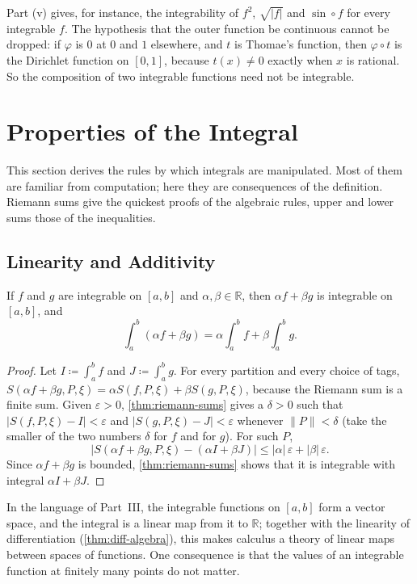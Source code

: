 Part (v) gives, for instance, the integrability of $f^2$, $\sqrt{|f|}$ and $\sin\circ f$ for every integrable $f$. The hypothesis that the outer function be continuous cannot be dropped: if $\varphi$ is $0$ at $0$ and $1$ elsewhere, and $t$ is Thomae's function, then $\varphi\circ t$ is the Dirichlet function on $[0,1]$, because $t(x)\ne0$ exactly when $x$ is rational. So the composition of two integrable functions need not be integrable.

\section{Properties of the Integral}
\label{sec:integral-properties}

This section derives the rules by which integrals are manipulated. Most of them are familiar from computation; here they are consequences of the definition. Riemann sums give the quickest proofs of the algebraic rules, upper and lower sums those of the inequalities.

\subsection{Linearity and Additivity}

\begin{theorem}[Linearity]
\label{thm:integral-linear}
If $f$ and $g$ are integrable on $[a,b]$ and $\alpha,\beta\in\mathbb R$, then $\alpha f+\beta g$ is integrable on $[a,b]$, and
\[
\int_a^b(\alpha f+\beta g)=\alpha\int_a^bf+\beta\int_a^bg .
\]
\end{theorem}

\begin{proof}
Let $I\coloneqq\int_a^bf$ and $J\coloneqq\int_a^bg$. For every partition and every choice of tags, $S(\alpha f+\beta g,P,\xi)=\alpha S(f,P,\xi)+\beta S(g,P,\xi)$, because the Riemann sum is a finite sum. Given $\varepsilon>0$, \cref{thm:riemann-sums} gives a $\delta>0$ such that $|S(f,P,\xi)-I|<\varepsilon$ and $|S(g,P,\xi)-J|<\varepsilon$ whenever $\|P\|<\delta$ (take the smaller of the two numbers $\delta$ for $f$ and for $g$). For such $P$,
\[
\bigl|S(\alpha f+\beta g,P,\xi)-(\alpha I+\beta J)\bigr|\le|\alpha|\,\varepsilon+|\beta|\,\varepsilon .
\]
Since $\alpha f+\beta g$ is bounded, \cref{thm:riemann-sums} shows that it is integrable with integral $\alpha I+\beta J$.
\end{proof}

In the language of Part~III, the integrable functions on $[a,b]$ form a vector space, and the integral is a linear map from it to $\mathbb R$; together with the linearity of differentiation (\cref{thm:diff-algebra}), this makes calculus a theory of linear maps between spaces of functions. One consequence is that the values of an integrable function at finitely many points do not matter.

